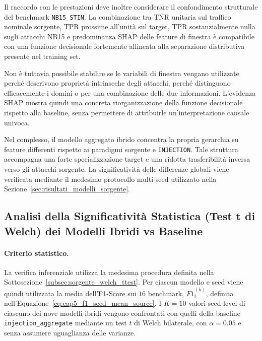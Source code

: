 Il raccordo con le prestazioni deve inoltre considerare il confondimento strutturale del benchmark \texttt{NB15\_STIN}. 
La combinazione tra TNR unitaria sul traffico nominale sorgente, TPR prossime all'unità sul target, TPR sostanzialmente nulla sugli attacchi NB15 e predominanza SHAP delle feature di finestra è compatibile con una funzione decisionale fortemente allineata alla separazione distributiva presente nel training set.

Non è tuttavia possibile stabilire se le variabili di finestra vengano utilizzate perché descrivono proprietà intrinseche degli attacchi, perché distinguono efficacemente i domini o per una combinazione delle due informazioni. 
L'evidenza SHAP mostra quindi una concreta riorganizzazione della funzione decisionale rispetto alla baseline, senza permettere di attribuirle un'interpretazione causale univoca.

Nel complesso, il modello aggregato ibrido concentra la propria gerarchia su feature differenti rispetto ai paradigmi sorgente e \texttt{INJECTION}.
Tale struttura accompagna una forte specializzazione target e una ridotta trasferibilità inversa verso gli attacchi sorgente. 
La significatività delle differenze globali viene verificata mediante il medesimo protocollo multi-seed utilizzato nella Sezione~\ref{sec:risultati_modelli_sorgente}.



\subsection{Analisi della Significatività Statistica (Test t di Welch) dei Modelli Ibridi vs Baseline}
\label{subsec:ibridi_welch_ttest}

\paragraph{Criterio statistico.}
La verifica inferenziale utilizza la medesima procedura definita nella Sottosezione~\ref{subsec:sorgente_welch_ttest}. 
Per ciascun modello e seed viene quindi utilizzata la media dell'F1-Score sui $16$ benchmark, $\overline{F1}_{i}^{(k)}$, definita nell'Equazione~\eqref{eq:cap5_f1_seed_mean_source}. 
I $K=10$ valori seed-level di ciascuno dei nove modelli ibridi vengono confrontati con quelli della baseline \texttt{injection\_aggregate} mediante un test $t$ di Welch bilaterale, con $\alpha=0.05$ e senza assumere uguaglianza delle varianze.

